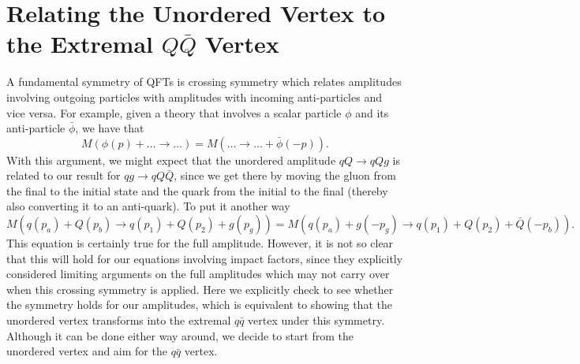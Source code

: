 \chapter{Relating the Unordered Vertex to the Extremal $Q\bar{Q}$ Vertex}
\label{app:crossing}

A fundamental symmetry of QFTs is crossing symmetry which relates amplitudes involving outgoing particles with amplitudes with incoming anti-particles and vice versa. For example, given a theory that involves a scalar particle $\phi$ and its anti-particle $\bar{\phi}$, we have that 
\begin{equation}
M(\phi(p) + \ldots \to \ldots) = M(\ldots \to \ldots + \bar{\phi}(-p)).
\end{equation}
With this argument, we might expect that the unordered amplitude $qQ \to qQg$ is related to our result for $qg \to qQ\bar{Q}$, since we get there by moving the gluon from the final to the initial state and the quark from the initial to the final (thereby also converting it to an anti-quark). To put it another way
\begin{equation}
M(q(p_a) + Q(p_b) \to q(p_1) + Q(p_2) + g(p_g)) = M(q(p_a) + g(-p_g) \to q(p_1) + Q(p_2) + \bar{Q}(-p_b)).
\end{equation}
This equation is certainly true for the full amplitude. However, it is not so clear that this will hold for our equations involving impact factors, since they explicitly considered limiting arguments on the full amplitudes which may not carry over when this crossing symmetry is applied. Here we explicitly check to see whether the symmetry holds for our amplitudes, which is equivalent to showing that the unordered vertex transforms into the extremal $q\bar{q}$ vertex under this symmetry. Although it can be done either way around, we decide to start from the unordered vertex and aim for the $q\bar{q}$ vertex. 

